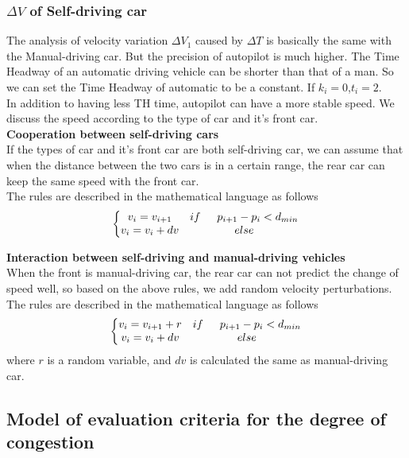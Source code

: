 \documentclass{mcmthesis}
\begin{document}
\subsubsection{$\Delta V$ of Self-driving car}
The analysis of velocity variation $\Delta V_{1}$ caused by $\Delta T$ is basically the same with the Manual-driving car. But the precision of autopilot is much higher. The Time Headway of an automatic driving vehicle can be shorter than that of a man. So we can set the Time Headway of automatic to be a constant. If $k_i=0$,$t_i=2$.\\
\indent In addition to having less TH time, autopilot can have a more stable speed. We discuss the speed according to the type of car and it's front car.\\

\textbf{Cooperation between self-driving cars \\}
\indent If the types of car and it's front car are both self-driving car, we can assume that when the distance between the two cars is in a certain range, the rear car can keep the same speed with the front car.\\
\indent The rules are described in the mathematical language as follows
\begin{equation}
\left\{\begin{matrix}
v_i=v_{i+1} &if\indent p_{i+1}-p_{i}<d_{min} \\ 
v_i=v_i+dv& else
\end{matrix}\right.
\end{equation}

\textbf{Interaction between self-driving and manual-driving vehicles \\}
\indent When the front is manual-driving car, the rear car can not predict the change of speed well, so based on the above rules, we add random velocity perturbations.
\indent The rules are described in the mathematical language as follows
\begin{equation}
\left\{\begin{matrix}
	v_i=v_{i+1}+r &if\indent p_{i+1}-p_{i}<d_{min} \\ 
	v_i=v_i+dv& else
\end{matrix}\right.
\end{equation}
where $r$ is a random variable, and $dv$ is calculated the same as manual-driving car.
\subsection{Model of evaluation criteria for the degree of congestion}
\label{evaluation criteria}
\end{document}
